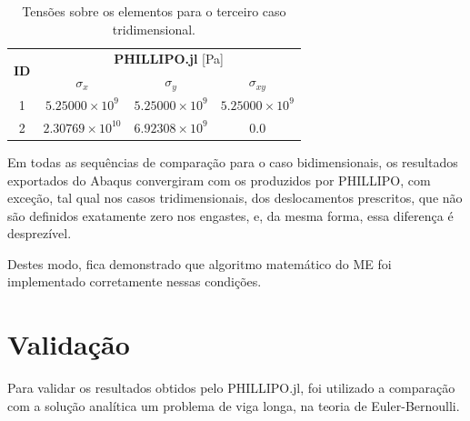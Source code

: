 \begin{table}
    \centering
    \caption{Tensões sobre os elementos para o terceiro caso tridimensional.}
    \begin{tabular}{c | c c c}
        \toprule
        \multirow{2}{*}{\textbf{ID}} & \multicolumn{3}{c}{\textbf{PHILLIPO.jl} [Pa]}  \\
                                           & \textbf{$\sigma_x$} & \textbf{$\sigma_y$} & \textbf{$\sigma_{xy}$} \\                            
        \midrule
        1 & $5.25000\times10^{9}$ & $5.25000\times10^{9}$ & $5.25000\times10^{9}$ \\
        2 & $2.30769\times10^{10}$ & $6.92308\times10^{9}$ & $0.0$ \\
        \bottomrule
    \end{tabular}
    \label{tab:verificacao_quadrado_3_tensoes}
\end{table}


Em todas as sequências de comparação para o caso bidimensionais, os resultados exportados do Abaqus convergiram com os produzidos por PHILLIPO, com exceção, tal qual nos casos tridimensionais, dos deslocamentos prescritos, que não são definidos exatamente zero nos engastes, e, da mesma forma, essa diferença é desprezível.

Destes modo, fica demonstrado que algoritmo matemático do ME foi implementado corretamente nessas condições. 

\section{Validação}

Para validar os resultados obtidos pelo PHILLIPO.jl, foi utilizado a comparação com a solução analítica um problema de viga longa, na teoria de Euler-Bernoulli.
